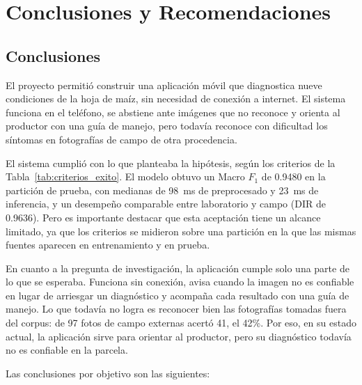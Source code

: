 \chapter*{Conclusiones y Recomendaciones}

\section*{Conclusiones}

El proyecto permiti\'o construir una aplicaci\'on m\'ovil que diagnostica nueve condiciones de la hoja de ma\'iz, sin necesidad de conexi\'on a internet. El sistema funciona en el tel\'efono, se abstiene ante im\'agenes que no reconoce y orienta al productor con una gu\'ia de manejo, pero todav\'ia reconoce con dificultad los s\'intomas en fotograf\'ias de campo de otra procedencia.

El sistema cumpli\'o con lo que planteaba la hip\'otesis, seg\'un los criterios de la Tabla~\ref{tab:criterios_exito}. El modelo obtuvo un Macro $F_1$ de 0.9480 en la partici\'on de prueba, con medianas de 98~ms de preprocesado y 23~ms de inferencia, y un desempe\~no comparable entre laboratorio y campo (DIR de 0.9636). Pero es importante destacar que esta aceptaci\'on tiene un alcance limitado, ya que los criterios se midieron sobre una partici\'on en la que las mismas fuentes aparecen en entrenamiento y en prueba.

En cuanto a la pregunta de investigaci\'on, la aplicaci\'on cumple solo una parte de lo que se esperaba. Funciona sin conexi\'on, avisa cuando la imagen no es confiable en lugar de arriesgar un diagn\'ostico y acompa\~na cada resultado con una gu\'ia de manejo. Lo que todav\'ia no logra es reconocer bien las fotograf\'ias tomadas fuera del corpus: de 97 fotos de campo externas acert\'o 41, el 42\%. Por eso, en su estado actual, la aplicaci\'on sirve para orientar al productor, pero su diagn\'ostico todav\'ia no es confiable en la parcela.

Las conclusiones por objetivo son las siguientes:

